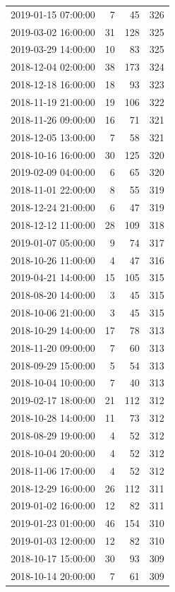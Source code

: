 \begin{tabular}{lrrr}
2019-01-15 07:00:00 & 7 & 45 & 326 \\
2019-03-02 16:00:00 & 31 & 128 & 325 \\
2019-03-29 14:00:00 & 10 & 83 & 325 \\
2018-12-04 02:00:00 & 38 & 173 & 324 \\
2018-12-18 16:00:00 & 18 & 93 & 323 \\
2018-11-19 21:00:00 & 19 & 106 & 322 \\
2018-11-26 09:00:00 & 16 & 71 & 321 \\
2018-12-05 13:00:00 & 7 & 58 & 321 \\
2018-10-16 16:00:00 & 30 & 125 & 320 \\
2019-02-09 04:00:00 & 6 & 65 & 320 \\
2018-11-01 22:00:00 & 8 & 55 & 319 \\
2018-12-24 21:00:00 & 6 & 47 & 319 \\
2018-12-12 11:00:00 & 28 & 109 & 318 \\
2019-01-07 05:00:00 & 9 & 74 & 317 \\
2018-10-26 11:00:00 & 4 & 47 & 316 \\
2019-04-21 14:00:00 & 15 & 105 & 315 \\
2018-08-20 14:00:00 & 3 & 45 & 315 \\
2018-10-06 21:00:00 & 3 & 45 & 315 \\
2018-10-29 14:00:00 & 17 & 78 & 313 \\
2018-11-20 09:00:00 & 7 & 60 & 313 \\
2018-09-29 15:00:00 & 5 & 54 & 313 \\
2018-10-04 10:00:00 & 7 & 40 & 313 \\
2019-02-17 18:00:00 & 21 & 112 & 312 \\
2018-10-28 14:00:00 & 11 & 73 & 312 \\
2018-08-29 19:00:00 & 4 & 52 & 312 \\
2018-10-04 20:00:00 & 4 & 52 & 312 \\
2018-11-06 17:00:00 & 4 & 52 & 312 \\
2018-12-29 16:00:00 & 26 & 112 & 311 \\
2019-01-02 16:00:00 & 12 & 82 & 311 \\
2019-01-23 01:00:00 & 46 & 154 & 310 \\
2019-01-03 12:00:00 & 12 & 82 & 310 \\
2018-10-17 15:00:00 & 30 & 93 & 309 \\
2018-10-14 20:00:00 & 7 & 61 & 309 \\

\end{tabular}
